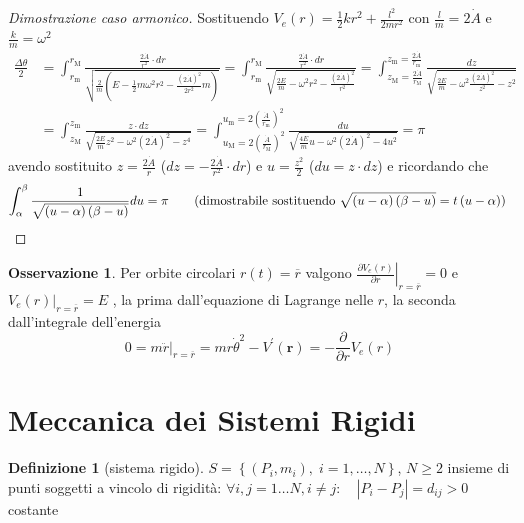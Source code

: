 \documentclass[a4paper,10pt]{article}
\theoremstyle{definition}
\theoremstyle{indentdefinition}
\newtheorem{defn}{Definizione}[section]
\theoremstyle{indenttheorem}
\theoremstyle{myremark}
\newtheorem*{rem*}{Osservazione}
\theoremstyle{indentgeneral}
\begin{document}
\begin{proof}[Dimostrazione caso armonico]
Sostituendo $V_{e}\left(r\right)=\frac{1}{2}kr^{2}+\frac{l^{2}}{2mr^{2}}$
con $\frac{l}{m}=2\dot{A}$ e $\frac{k}{m}=\omega^{2}$ 
\begin{align*}
\frac{\Delta\theta}{2} & =\int_{r_{\text{m}}}^{r_{\text{M}}}\frac{\frac{2\dot{A}}{r^{2}}\cdot dr}{\sqrt{\frac{2}{m}\left(E-\frac{1}{2}m\omega^{2}r^{2}-\frac{\left(2\dot{A}\right)^{2}}{2r^{2}}m\right)}}=\int_{r_{\text{m}}}^{r_{\text{M}}}\frac{\frac{2\dot{A}}{r^{2}}\cdot dr}{\sqrt{\frac{2E}{m}-\omega^{2}r^{2}-\frac{\left(2\dot{A}\right)^{2}}{r^{2}}}}=\int_{z_{\text{M}}=\frac{2\dot{A}}{r_{\text{M}}}}^{z_{\text{m}}=\frac{2\dot{A}}{r_{\text{m}}}}\frac{dz}{\sqrt{\frac{2E}{m}-\omega^{2}\frac{\left(2\dot{A}\right)^{2}}{z^{2}}-z^{2}}}\\
 & =\int_{z_{\text{M}}}^{z_{\text{m}}}\frac{z\cdot dz}{\sqrt{\frac{2E}{m}z^{2}-\omega^{2}\left(2\dot{A}\right)^{2}-z^{4}}}=\int_{u_{\text{M}}=2\left(\frac{\dot{A}}{r_{\text{M}}}\right)^{2}}^{u_{\text{m}}=2\left(\frac{\dot{A}}{r_{\text{m}}}\right)^{2}}\frac{du}{\sqrt{\frac{4E}{m}u-\omega^{2}\left(2\dot{A}\right)^{2}-4u^{2}}}=\pi
\end{align*}
avendo sostituito $z=\frac{2\dot{A}}{r}$ ($dz=-\frac{2\dot{A}}{r^{2}}\cdot dr$)
e $u=\frac{z^{2}}{2}$ ($du=z\cdot dz$) e ricordando che
\[
\int_{\alpha}^{\beta}\frac{1}{\sqrt{\left(u-\alpha\right)\left(\beta-u\right)}}du=\pi\qquad\text{(dimostrabile sostituendo \ensuremath{\sqrt{\left(u-\alpha\right)\left(\beta-u\right)}=t\left(u-\alpha\right)}) }
\]
\end{proof}
\begin{rem*}
Per orbite circolari $r\left(t\right)=\overline{r}$ valgono $\left.\frac{\partial V_{e}\left(r\right)}{\partial r}\right|_{r=\overline{r}}=0$
e $\left.V_{e}\left(r\right)\right|_{r=\overline{r}}=E$ , la prima
dall'equazione di Lagrange nelle $r$, la seconda dall'integrale dell'energia
\[
0=\left.m\ddot{r}\right|_{r=\overline{r}}=mr\dot{\theta}^{2}-V^{\prime}\left(\boldsymbol{r}\right)=-\frac{\partial}{\partial r}V_{e}\left(r\right)
\]
\end{rem*}
\pagebreak{}

\section{Meccanica dei Sistemi Rigidi}
\begin{defn}[sistema rigido]
\label{def:sistema-rigido}$S=\left\{ (P_{i},m_i),\; i=1,\dots ,N\right\}$, $N\ge2$ insieme di punti soggetti a vincolo di rigidità: $\forall i,j=1\dots N,i\ne j:\quad \left|P_{i}-P_{j}\right|=d_{ij}>0$ costante
\end{defn}
\end{document}
